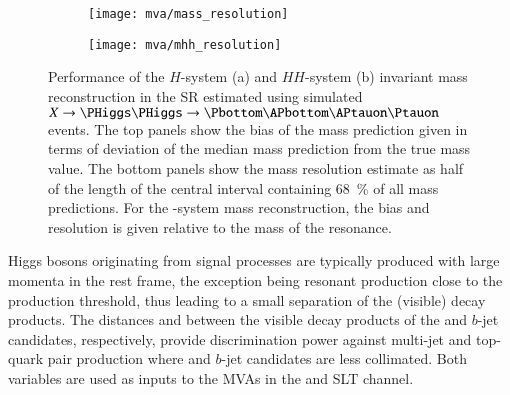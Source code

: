 


\begin{figure}[htbp]
  \centering

  \begin{subfigure}[t]{.5\textwidth}
    \centering
    \texttt{[image: mva/mass\_resolution]}
    \label{fig:mass_reconstruction_H}
  \end{subfigure}\hfill%
  \begin{subfigure}[t]{.5\textwidth}
    \centering
    \texttt{[image: mva/mhh\_resolution]}
    \label{fig:mass_reconstruction_HH}
  \end{subfigure}

  \caption[Performance of the $H$-system and $HH$-system invariant mass
  reconstruction in the \hadhad SR.]{Performance of the $H$-system (a) and
    $HH$-system (b) invariant mass reconstruction in the \hadhad SR estimated
    using simulated $X \to \HH \to \bbtautau$ events.  The top panels show the
    bias of the mass prediction given in terms of deviation of the median mass
    prediction from the true mass value. The bottom panels show the mass
    resolution estimate as half of the length of the central interval containing
    \SI{68}{\percent} of all mass predictions. For the \HH-system mass
    reconstruction, the bias and resolution is given relative to the mass of the
    resonance.}%
  \label{fig:mass_reconstruction}
\end{figure}

Higgs bosons originating from signal processes are typically produced
with large momenta in the \HH rest frame, the exception being resonant
\HH production \mX close to the \HH production threshold, thus leading
to a small separation of the (visible) \PHiggs decay products. The
distances \dRtautau and \dRbb between the visible decay products of
the \tauleptons and $b$-jet candidates, respectively, provide
discrimination power against multi-jet and top-quark pair production
where \tauleptons and $b$-jet candidates are less collimated. Both
variables are used as inputs to the MVAs in the \hadhad and \lephad
SLT channel.

